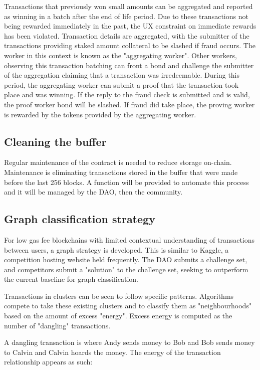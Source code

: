 Transactions that previously won small amounts can be aggregated and reported as winning in a batch after the end of life period. Due to these transactions not being rewarded immediately in the past, the UX constraint on immediate rewards has been violated. Transaction details are aggregated, with the submitter of the transactions providing staked amount collateral to be slashed if fraud occurs. The worker in this context is known as the "aggregating worker". Other workers, observing this transaction batching can front a bond and challenge the submitter of the aggregation claiming that a transaction was irredeemable. During this period, the aggregating worker can submit a proof that the transaction took place and was winning. If the reply to the fraud check is submitted and is valid, the proof worker bond will be slashed. If fraud did take place, the proving worker is rewarded by the tokens provided by the aggregating worker.

\subsection{Cleaning the buffer}

Regular maintenance of the contract is needed to reduce storage on-chain. Maintenance is eliminating transactions stored in the buffer that were made before the last 256 blocks. A function will be provided to automate this process and it will be managed by the DAO, then the community.

\subsection{Graph classification strategy}

For low gas fee blockchains with limited contextual understanding of transactions between users, a graph strategy is developed. This is similar to Kaggle, a competition hosting website held frequently. The DAO submits a challenge set, and competitors submit a "solution" to the challenge set, seeking to outperform the current baseline for graph classification.

Transactions in clusters can be seen to follow specific patterns. Algorithms compete to take these existing clusters and to classify them as "neighbourhoods" based on the amount of excess "energy". Excess energy is computed as the number of "dangling" transactions.

A dangling transaction is where Andy sends money to Bob and Bob sends money to Calvin and Calvin hoards the money. The energy of the transaction relationship appears as such:

